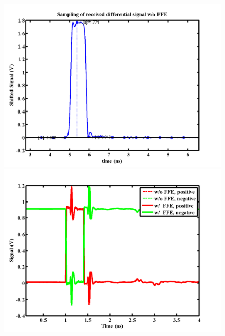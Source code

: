 \documentclass{book}  %
\begin{document}
\begin{paper}
\begin{figure}[htbp!]
	\centering	
	\begin{minipage}[tb]{0.5\textwidth}
		\centering	
		\includegraphics[width=\textwidth]{./img/Verilog/3G/2_sampling.png}
		\subcaption{}
	\end{minipage}%
	\begin{minipage}[tb]{0.5\textwidth}
		\centering	
		\includegraphics[width=\textwidth]{./img/Verilog/3G/1.png}
		\subcaption{}
	\end{minipage}
\end{figure}	
\begin{figure}[htbp!]	
	\ContinuedFloat
	\begin{minipage}[tb]{0.5\textwidth}

\end{minipage}
\end{figure}
\end{paper}
\end{document}
